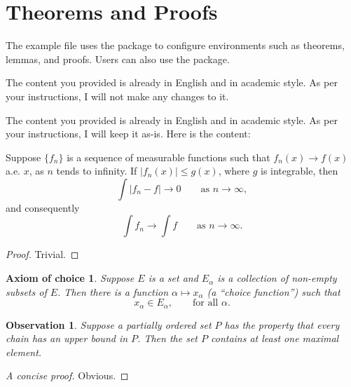 \section{Theorems and Proofs}

The example file uses the  package to configure environments such as theorems, lemmas, and proofs.
Users can also use the  package.

The content you provided is already in English and in academic style. As per your instructions, I will not make any changes to it.

The content you provided is already in English and in academic style. As per your instructions, I will keep it as-is. Here is the content:

\begin{theorem}
  Suppose $\{f_n\}$ is a sequence of measurable functions such that
  $f_n(x) \to f(x)$ a.e. $x$, as $n$ tends to infinity.
  If $|f_n(x)| \le g(x)$, where $g$ is integrable, then
  \begin{equation}
    \int |f_n - f| \to 0 \qquad \text{as } n \to \infty,
  \end{equation}
  and consequently
  \begin{equation}
    \int f_n \to \int f \qquad \text{as } n \to \infty.
  \end{equation}
\end{theorem}

\begin{proof}
  Trivial.
\end{proof}

\newtheorem*{axiomofchoice}{Axiom of choice}
\begin{axiomofchoice}
  Suppose $E$ is a set and ${E_\alpha}$ is a collection of
  non-empty subsets of $E$. Then there is a function $\alpha
  \mapsto x_\alpha$ (a ``choice function'') such that
  \begin{equation}
    x_\alpha \in E_\alpha,\qquad \text{for all }\alpha.
  \end{equation}
\end{axiomofchoice}

\newtheorem{observation}{Observation}
\begin{observation}
  Suppose a partially ordered set $P$ has the property
  that every chain has an upper bound in $P$. Then the
  set $P$ contains at least one maximal element.
\end{observation}
\begin{proof}[A concise proof]
  Obvious.
\end{proof}
